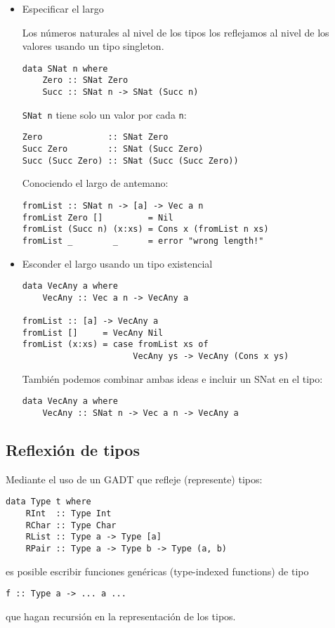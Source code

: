 \documentclass{article}
\newcommand{\imp}[1]{\textcolor{color1}{#1}}
\begin{document}
\begin{itemize}
\item Especificar el largo

Los números naturales al nivel de los tipos los reflejamos al nivel de los valores usando un tipo singleton.
\begin{lstlisting}
data SNat n where
    Zero :: SNat Zero
    Succ :: SNat n -> SNat (Succ n)
\end{lstlisting}
\imp{\texttt{SNat n}} tiene solo un valor por cada \texttt{n}:
\begin{lstlisting}
Zero             :: SNat Zero
Succ Zero        :: SNat (Succ Zero)
Succ (Succ Zero) :: SNat (Succ (Succ Zero))
\end{lstlisting}
Conociendo el largo de antemano:
\begin{lstlisting}
fromList :: SNat n -> [a] -> Vec a n
fromList Zero []         = Nil
fromList (Succ n) (x:xs) = Cons x (fromList n xs)
fromList _        _      = error "wrong length!"
\end{lstlisting}
\item Esconder el largo usando un tipo existencial

\begin{lstlisting}
data VecAny a where
    VecAny :: Vec a n -> VecAny a

fromList :: [a] -> VecAny a
fromList []     = VecAny Nil
fromList (x:xs) = case fromList xs of
                      VecAny ys -> VecAny (Cons x ys)
\end{lstlisting}
También podemos combinar ambas ideas e incluir un \imp{SNat} en el
tipo:
\begin{lstlisting}
data VecAny a where
    VecAny :: SNat n -> Vec a n -> VecAny a
\end{lstlisting}
\end{itemize}

\subsection{Reflexión de tipos}

Mediante el uso de un GADT que refleje (represente) tipos:
\begin{lstlisting}
data Type t where
    RInt  :: Type Int
    RChar :: Type Char
    RList :: Type a -> Type [a]
    RPair :: Type a -> Type b -> Type (a, b)

\end{lstlisting}
es posible escribir \imp{funciones genéricas} (\imp{type-indexed functions}) de
tipo
\begin{lstlisting}
f :: Type a -> ... a ...
\end{lstlisting}
que hagan recursión en la representación de los tipos.
\end{document}
